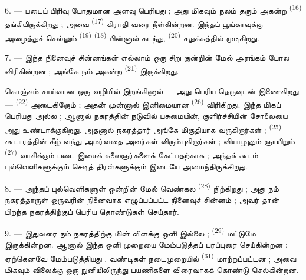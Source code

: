 \VUsaut{5.0mm}
\VUsaut{3.4mm}

6. --- படைப் பிரிவு போதுமான அளவு பெரியது ; அது மிகவும் நலம் தரும்
அகன்ற  \textsuperscript{(16)}
தங்கியிருக்கிறது ; அவை  \textsuperscript{(17)}
கிராதி வரை நீள்கின்றன. இந்தப் பூங்காவுக்கு அழைத்துச் செல்லும்
 \textsuperscript{(19)} 
\textsuperscript{(18)} பின்னால் கடந்து, 
\textsuperscript{(20)} சதுக்கத்தில் முடிகிறது.

7. --- இந்த நினைவுச் சின்னங்கள் எல்லாம் ஒரு சிறு குன்றின் மேல்
அரங்கம் போல விரிகின்றன ; அங்கே நம் அகன்ற 
\textsuperscript{(21)} இருக்கிறது.

கொஞ்சம் சாய்வான ஒரு வழியில் இறங்கினால் — அது பெரிய தெருவுடன்
இணைகிறது —  \textsuperscript{(22)}
அடைகிறோம் ; அதன் முன்னால் இனிமையான 
\textsuperscript{(26)} விரிகிறது. இந்த 
மிகப் பெரியது அல்ல ; ஆனால் நகரத்தின் நடுவில் பசுமையின், குளிர்ச்சியின்
சோலையை அது உண்டாக்குகிறது. அதனால் நகரத்தார் அங்கே மிகுதியாக
வருகிறார்கள் ;  \textsuperscript{(25)}
கூடாரத்தின் கீழ் வந்து அமர்வதை அவர்கள் விரும்புகிறார்கள் ; வியாழனும்
ஞாயிறும்  \textsuperscript{(27)} வாசிக்கும்
படை இசைக் கலைஞர்களைக் கேட்பதற்காக ; அந்தக் கூடம் புல்வெளிகளுக்கும்
செடித் திரள்களுக்கும் இடையே அமைந்திருக்கிறது.

8. --- அந்தப் புல்வெளிகளுள் ஒன்றின் மேல் வெண்கல 
\textsuperscript{(28)} நிற்கிறது ; அது நம் நகரத்தாருள் ஒருவரின்
நினைவாக எழுப்பப்பட்ட நினைவுச் சின்னம் ; அவர் தான் பிறந்த நகரத்திற்குப்
பெரிய தொண்டுகள் செய்தார்.

\VUsaut{4.0mm}
\VUsaut{3.4mm}

9. --- இதுவரை நம் நகரத்திற்கு மின் விளக்கு ஒளி இல்லை ;  \textsuperscript{(29)} மட்டுமே இருக்கின்றன. ஆனால்
 இந்த ஒளி முறையை மேம்படுத்தப்
பரப்புரை செய்கின்றன ; 
ஏற்கெனவே மேம்படுத்தியது . 
  வண்டிகள் நடைமுறையில்  \textsuperscript{(31)} மாற்றப்பட்டன ; அவை
மிகவும்  விலைக்கு  ஒரு நுனியிலிருந்து
 பயணிகளை விரைவாகக் கொண்டு செல்கின்றன.

